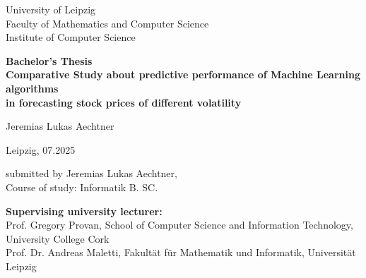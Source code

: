 \documentclass[a4paper,12pt]{report}
\begin{document}
\thispagestyle{empty}

\begin{center}
  \large
University of Leipzig\\
Faculty of Mathematics and Computer Science\\[0.3cm]
Institute of Computer Science
\end{center}

\vspace{3cm}

\begin{center}
  \LARGE\bfseries
  Bachelor's Thesis\\[1cm]
  Comparative Study about predictive performance of Machine Learning algorithms\\
  in forecasting stock prices of different volatility
\end{center}

\vspace{3cm}

\begin{center}
  \large
  Jeremias Lukas Aechtner
\end{center}

\vfill

\noindent
\begin{minipage}[t]{0.5\textwidth}
  Leipzig, 07.2025
\end{minipage}%
\begin{minipage}[t]{0.5\textwidth}
  \raggedleft
  submitted by Jeremias Lukas Aechtner,\\
  Course of study: Informatik B. SC.
\end{minipage}

\vspace{2cm}

\noindent
\begin{minipage}[t]{\textwidth}
  \small
  \textbf{Supervising university lecturer:}\\
  Prof. Gregory Provan, School of Computer Science and Information Technology, University College Cork\\
  Prof. Dr. Andreas Maletti, Fakultät für Mathematik und Informatik, Universität Leipzig
\end{minipage}
\end{document}
